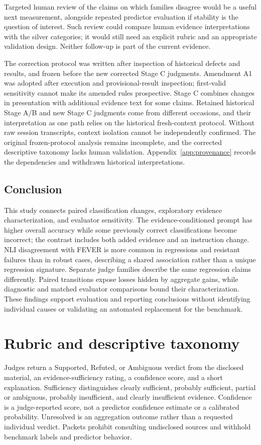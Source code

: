 \documentclass[11pt,letterpaper]{article}
\begin{document}
Targeted human review of the claims on which families disagree would be a useful next measurement, alongside repeated predictor evaluation if stability is the question of interest. Such review could compare human evidence interpretations with the silver categories; it would still need an explicit rubric and an appropriate validation design. Neither follow-up is part of the current evidence.

The correction protocol was written after inspection of historical defects and results, and frozen before the new corrected Stage C judgments. Amendment A1 was adopted after execution and provisional-result inspection; first-valid sensitivity cannot make its amended rules prospective. Stage C combines changes in presentation with additional evidence text for some claims. Retained historical Stage A/B and new Stage C judgments come from different occasions, and their interpretation as one path relies on the historical fresh-context protocol. Without raw session transcripts, context isolation cannot be independently confirmed. The original frozen-protocol analysis remains incomplete, and the corrected descriptive taxonomy lacks human validation. Appendix~\ref{app:provenance} records the dependencies and withdrawn historical interpretations.

\subsection{Conclusion}
This study connects paired classification changes, exploratory evidence characterization, and evaluator sensitivity. The evidence-conditioned prompt has higher overall accuracy while some previously correct classifications become incorrect; the contrast includes both added evidence and an instruction change. NLI disagreement with FEVER is more common in regressions and resistant failures than in robust cases, describing a shared association rather than a unique regression signature. Separate judge families describe the same regression claims differently. Paired transitions expose losses hidden by aggregate gains, while diagnostic and matched evaluator comparisons bound their characterization. These findings support evaluation and reporting conclusions without identifying individual causes or validating an automated replacement for the benchmark.


\clearpage
\appendix
\section{Rubric and descriptive taxonomy}\label{app:rubric}
Judges return a Supported, Refuted, or Ambiguous verdict from the disclosed material, an evidence-sufficiency rating, a confidence score, and a short explanation. Sufficiency distinguishes clearly sufficient, probably sufficient, partial or ambiguous, probably insufficient, and clearly insufficient evidence. Confidence is a judge-reported score, not a predictor confidence estimate or a calibrated probability. Unresolved is an aggregation outcome rather than a requested individual verdict. Packets prohibit consulting undisclosed sources and withhold benchmark labels and predictor behavior.
\end{document}
